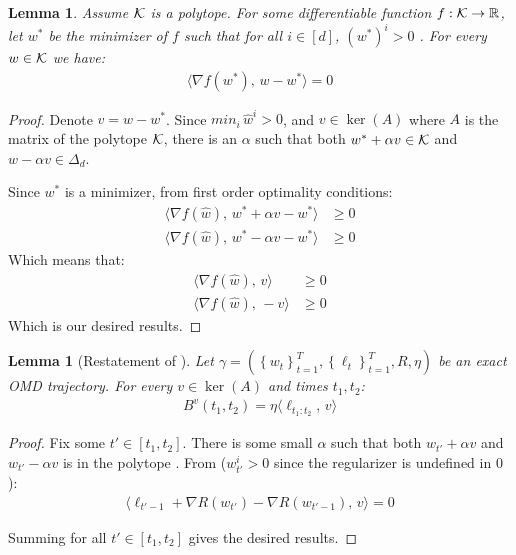 \documentclass[10pt]{article}
\newtheorem{lemma}[theorem]{Lemma}
\newtheorem*{lemma*}{Lemma}
\theoremstyle{definition}
\theoremstyle{remark}
\newcommand{\rr}{\mathbb{R}}
\newcommand\inprod[2]{\langle #1,\,#2 \rangle}
\newcommand{\curly}[1]{ {\left\{ #1 \right\}}}
\begin{document}
\begin{lemma}\label{lem:polytope optimality}
Assume $\mathcal K$ is a polytope. For some differentiable function $f:\cK\to\rr$, let $w^*$ be the minimizer of $f$ such that for all $i\in[d]$, $(w^*)^i > 0$ 
. For every $w\in\mathcal K$ we have:
\begin{align*}
    \inprod{\nabla f(w^*)}{w-w^*} = 0
\end{align*}
\end{lemma}
\begin{proof}
Denote $v=w-w^*$. Since $min_i \,\hat{w}^i > 0$, and $v\in \ker(A)$ where $A$ is the matrix of the polytope $\mathcal K$, there is an $\alpha$ such that both $w^* + \alpha v \in \mathcal K$ and $w - \alpha v \in \Delta_d$.

Since $w^*$ is a minimizer, from first order optimality conditions: 
\begin{align*}
    \inprod{\nabla f(\hat{w})}{w^*+\alpha v - w^*} &\ge 0 \\
    \inprod{\nabla f(\hat{w})}{w^*-\alpha v - w^*} &\ge 0
\end{align*}
Which means that:
\begin{align*}
        \inprod{\nabla f(\hat{w})}{v} &\ge 0 \\
    \inprod{\nabla f(\hat{w})}{-v} &\ge 0
\end{align*}
Which is our desired results.
\end{proof}


\begin{lemma*}[Restatement of ] 
Let $\gamma=(\curly{w_t}_{t=1}^T, \curly{\ell_t}_{t=1}^T, R, \eta)$ be an exact OMD trajectory. For every $v\in \ker(A)$ and times $t_1,t_2$:
\begin{align*}
    B^v(t_1,t_2) = \eta\inprod{\ell_{t_1:t_2}}{v}
\end{align*}
\end{lemma*}
\begin{proof}
Fix some $t'\in[t_1,t_2]$. There is some small $\alpha$ such that both $w_{t'}+\alpha v$ and $w_{t'}-\alpha v$ is in the polytope 
. From  ($w_{t'}^i>0$ since the regularizer is undefined in $0$):
\begin{align*}
    \inprod{\ell_{t'-1} + \nabla R(w_{t'}) - \nabla R(w_{t'-1})}{v} = 0
\end{align*}

Summing for all $t'\in[t_1,t_2]$ gives the desired results.
\end{proof}
\end{document}
